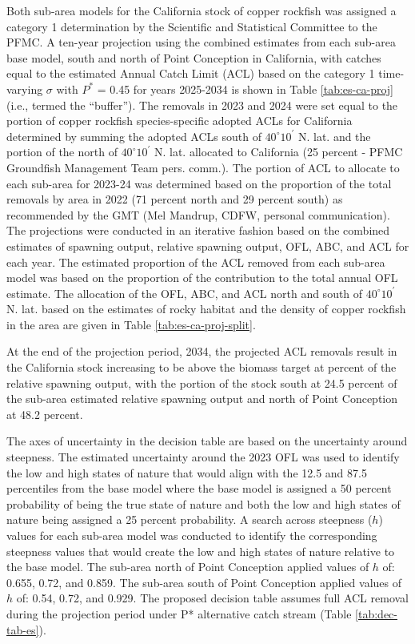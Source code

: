 \documentclass[11pt,
  letterpaper,
]{article}
\begin{document}
Both sub-area models for the California stock of copper rockfish was assigned a category 1 determination by the Scientific and Statistical Committee to the PFMC. A ten-year projection using the combined estimates from each sub-area base model, south and north of Point Conception in California, with catches equal to the estimated Annual Catch Limit (ACL) based on the category 1 time-varying \(\sigma\) with \(P^*\) = 0.45 for years 2025-2034 is shown in Table \ref{tab:es-ca-proj} (i.e., termed the ``buffer''). The removals in 2023 and 2024 were set equal to the portion of copper rockfish species-specific adopted ACLs for California determined by summing the adopted ACLs south of $40^\circ 10^\prime$ N. lat. and the portion of the north of $40^\circ 10^\prime$ N. lat. allocated to California (25 percent - PFMC Groundfish Management Team pers. comm.). The portion of ACL to allocate to each sub-area for 2023-24 was determined based on the proportion of the total removals by area in 2022 (71 percent north and 29 percent south) as recommended by the GMT (Mel Mandrup, CDFW, personal communication). The projections were conducted in an iterative fashion based on the combined estimates of spawning output, relative spawning output, OFL, ABC, and ACL for each year. The estimated proportion of the ACL removed from each sub-area model was based on the proportion of the contribution to the total annual OFL estimate. The allocation of the OFL, ABC, and ACL north and south of $40^\circ 10^\prime$ N. lat. based on the estimates of rocky habitat and the density of copper rockfish in the area are given in Table \ref{tab:es-ca-proj-split}.

At the end of the projection period, 2034, the projected ACL removals result in the California stock increasing to be above the biomass target at percent of the relative spawning output, with the portion of the stock south at 24.5 percent of the sub-area estimated relative spawning output and north of Point Conception at 48.2 percent.

The axes of uncertainty in the decision table are based on the uncertainty around steepness. The estimated uncertainty around the 2023 OFL was used to identify the low and high states of nature that would align with the 12.5 and 87.5 percentiles from the base model where the base model is assigned a 50 percent probability of being the true state of nature and both the low and high states of nature being assigned a 25 percent probability. A search across steepness (\(h\)) values for each sub-area model was conducted to identify the corresponding steepness values that would create the low and high states of nature relative to the base model. The sub-area north of Point Conception applied values of \(h\) of: 0.655, 0.72, and 0.859. The sub-area south of Point Conception applied values of \(h\) of: 0.54, 0.72, and 0.929. The proposed decision table assumes full ACL removal during the projection period under P* alternative catch stream (Table \ref{tab:dec-tab-es}).
\end{document}
